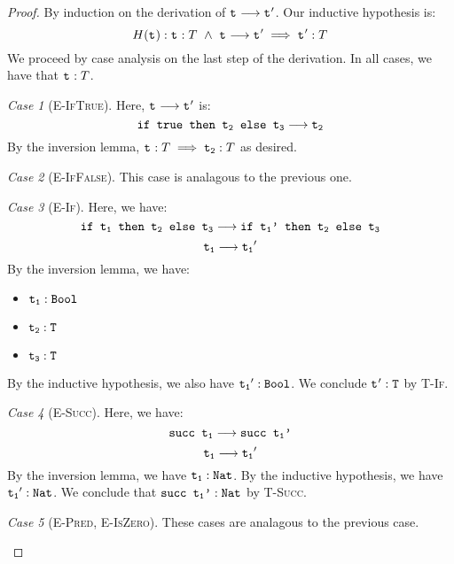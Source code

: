 \documentclass{article}
\newcommand{\term}[1]{\texttt{t\textsubscript{#1}}}
\renewcommand{\ss}[2]{#1 \longrightarrow #2}
\newcommand{\ms}[1]{\texttt{#1}}
\theoremstyle{remark}
\newtheorem*{case}{Case}
\begin{document}
    \begin{proof}
        By induction on the derivation of $\ss{\term{}}{\term{}'}$. Our inductive hypothesis is:
        $$H(\term{}): \term{} : T\ \land\ \ss{\term{}}{\term{}'} \implies \term{}' : T$$
        We proceed by case analysis on the last step of the derivation. In all cases,
        we have that $\term{} : T$.

        \begin{case}[\textsc{E-IfTrue}]
            Here, $\ss{\term{}}{\term{}'}$ is:
            $$\ss{\ms{if true then \term{2} else \term{3}}}{\term{2}}$$
            By the inversion lemma, $\term{} : T \implies \term{2} : T$ as desired.
        \end{case}
        \begin{case}[\textsc{E-IfFalse}]
            This case is analagous to the previous one.
        \end{case}

        \begin{case}[\textsc{E-If}]
            Here, we have:
            $$\ss{\ms{if \term{1} then \term{2} else \term{3}}}{\ms{if \term{1}' then \term{2} else \term{3}}}$$
            $$\ss{\term{1}}{\term{1}'}$$
            By the inversion lemma, we have:
            \begin{itemize}
                \item $\term{1} : \ms{Bool}$
                \item $\term{2} : \ms{T}$
                \item $\term{3} : \ms{T}$
            \end{itemize}
            By the inductive hypothesis, we also have $\term{1}' : \ms{Bool}$.
            We conclude $\term{}' : \ms{T}$ by \textsc{T-If}.
        \end{case}

        \begin{case}[\textsc{E-Succ}]
            Here, we have:
            $$\ss{\ms{succ \term{1}}}{\ms{succ \term{1}'}}$$
            $$\ss{\term{1}}{\term{1}'}$$
            By the inversion lemma, we have $\term{1} : \ms{Nat}$.
            By the inductive hypothesis, we have $\term{1}' : \ms{Nat}$.
            We conclude that $\ms{succ \term{1}'} : \ms{Nat}$ by \textsc{T-Succ}.
        \end{case}
        \begin{case}[\textsc{E-Pred}, \textsc{E-IsZero}]
            These cases are analagous to the previous case.
        \end{case}


\end{proof}
\end{document}

